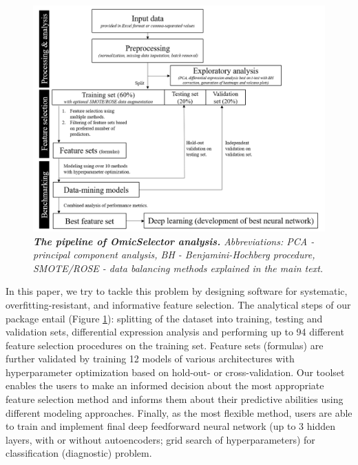 \documentclass[article]{jss}
\begin{document}
\begin{figure}[h!]
  \caption{\emph{\textbf{The pipeline of OmicSelector analysis.} Abbreviations: PCA - principal component analysis, BH - Benjamini-Hochberg procedure, SMOTE/ROSE - data balancing methods explained in the main text.}}\label{fig:1}
  \includegraphics[width=1\textwidth]{figure1.png}
\end{figure}

In this paper, we try to tackle this problem by designing software for systematic, overfitting-resistant, and informative feature selection. The analytical steps of our package entail (Figure \ref{fig:1}): splitting of the dataset into training, testing and validation sets, differential expression analysis and performing up to 94 different feature selection procedures on the training set. Feature sets (formulas) are further validated by training 12 models of various architectures with hyperparameter optimization based on hold-out- or cross-validation. Our toolset enables the users to make an informed decision about the most appropriate feature selection method and informs them about their predictive abilities using different modeling approaches. Finally, as the most flexible method, users are able to train and implement final deep feedforward neural network (up to 3 hidden layers, with or without autoencoders; grid search of hyperparameters) for classification (diagnostic) problem.





\end{document}
